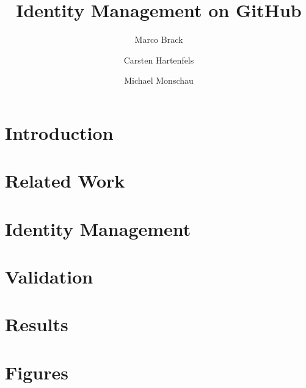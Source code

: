 \documentclass{article}
\begin{document}
\title{Identity Management on GitHub}
\author{Marco Brack \and Carsten Hartenfels \and Michael Monschau}
\maketitle

\begin{abstract}
  
\end{abstract}

\section{Introduction}


\section{Related Work}


\section{Identity Management}


\section{Validation}


\section{Results}





\clearpage
\appendix
\section{Figures}


\end{document}
